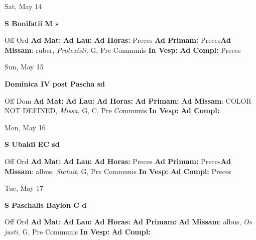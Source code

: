 \documentclass[10pt]{memoir}
\begin{document}
\begin{center}
\begin{minipage}{3.5in}
\vspace{2em}
\begin{center}Sat, May 14
\end{center}
\textbf{ \large S Bonifatii M
\textnormal{\normalsize s}}

\begin{justify}Off Ord
\textbf{Ad Mat: }
\textbf{Ad Lau: }
\textbf{Ad Horas: }Preces
\textbf{Ad Primam: }Preces\textbf{Ad Missam}: ruber, \textit{Protexisti,} G, Pre Communis
\textbf{In Vesp: }
\textbf{Ad Compl: }Preces
\end{justify}
\end{minipage}
\end{center}

\begin{center}
\begin{minipage}{3.5in}
\vspace{2em}
\begin{center}Sun, May 15
\end{center}
\textbf{ \large Dominica IV post Pascha
\textnormal{\normalsize sd}}

\begin{justify}Off Dom
\textbf{Ad Mat: }
\textbf{Ad Lau: }
\textbf{Ad Horas: }
\textbf{Ad Primam: }\textbf{Ad Missam}: COLOR NOT DEFINED, \textit{Missa,} G, C, Pre Communis
\textbf{In Vesp: }
\textbf{Ad Compl: }
\end{justify}
\end{minipage}
\end{center}

\begin{center}
\begin{minipage}{3.5in}
\vspace{2em}
\begin{center}Mon, May 16
\end{center}
\textbf{ \large S Ubaldi EC
\textnormal{\normalsize sd}}

\begin{justify}Off Ord
\textbf{Ad Mat: }
\textbf{Ad Lau: }
\textbf{Ad Horas: }Preces
\textbf{Ad Primam: }Preces\textbf{Ad Missam}: albus, \textit{Statuit,} G, Pre Communis
\textbf{In Vesp: }
\textbf{Ad Compl: }Preces
\end{justify}
\end{minipage}
\end{center}

\begin{center}
\begin{minipage}{3.5in}
\vspace{2em}
\begin{center}Tue, May 17
\end{center}
\textbf{ \large S Paschalis Baylon C
\textnormal{\normalsize d}}

\begin{justify}Off Ord
\textbf{Ad Mat: }
\textbf{Ad Lau: }
\textbf{Ad Horas: }
\textbf{Ad Primam: }\textbf{Ad Missam}: albus, \textit{Os justi,} G, Pre Communis
\textbf{In Vesp: }
\textbf{Ad Compl: }
\end{justify}
\end{minipage}
\end{center}
\end{document}
